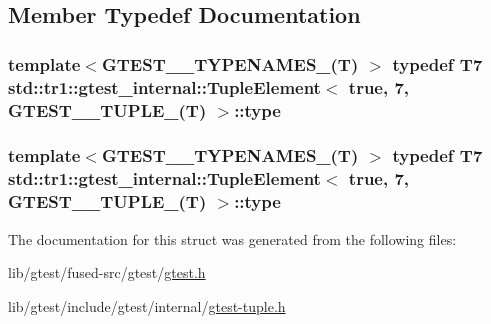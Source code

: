 \subsection{Member Typedef Documentation}
\hypertarget{structstd_1_1tr1_1_1gtest__internal_1_1_tuple_element_3_01true_00_017_00_01_g_t_e_s_t__10___t_u_p_l_e___07_t_08_01_4_afc625b9bf1ae4c5c51a968134dc9b30a}{
\subsubsection[{type}]{\setlength{\rightskip}{0pt plus 5cm}template$<$G\-T\-E\-S\-T\-\_\-\_\-\-T\-Y\-P\-E\-N\-A\-M\-E\-S\-\_\-(\-T) $>$ typedef T7 {\bf std\-::tr1\-::gtest\-\_\-internal\-::\-Tuple\-Element}$<$ true, 7, {\bf G\-T\-E\-S\-T\-\_\-\_\-\-T\-U\-P\-L\-E\-\_\-}(T) $>$\-::{\bf type}}}\label{structstd_1_1tr1_1_1gtest__internal_1_1_tuple_element_3_01true_00_017_00_01_g_t_e_s_t__10___t_u_p_l_e___07_t_08_01_4_afc625b9bf1ae4c5c51a968134dc9b30a}
\hypertarget{structstd_1_1tr1_1_1gtest__internal_1_1_tuple_element_3_01true_00_017_00_01_g_t_e_s_t__10___t_u_p_l_e___07_t_08_01_4_afc625b9bf1ae4c5c51a968134dc9b30a}{
\subsubsection[{type}]{\setlength{\rightskip}{0pt plus 5cm}template$<$G\-T\-E\-S\-T\-\_\-\_\-\-T\-Y\-P\-E\-N\-A\-M\-E\-S\-\_\-(\-T) $>$ typedef T7 {\bf std\-::tr1\-::gtest\-\_\-internal\-::\-Tuple\-Element}$<$ true, 7, {\bf G\-T\-E\-S\-T\-\_\-\_\-\-T\-U\-P\-L\-E\-\_\-}(T) $>$\-::{\bf type}}}\label{structstd_1_1tr1_1_1gtest__internal_1_1_tuple_element_3_01true_00_017_00_01_g_t_e_s_t__10___t_u_p_l_e___07_t_08_01_4_afc625b9bf1ae4c5c51a968134dc9b30a}


The documentation for this struct was generated from the following files\-:\begin{DoxyCompactItemize}
\item 
lib/gtest/fused-\/src/gtest/\hyperlink{fused-src_2gtest_2gtest_8h}{gtest.\-h}\item 
lib/gtest/include/gtest/internal/\hyperlink{gtest-tuple_8h}{gtest-\/tuple.\-h}\end{DoxyCompactItemize}
